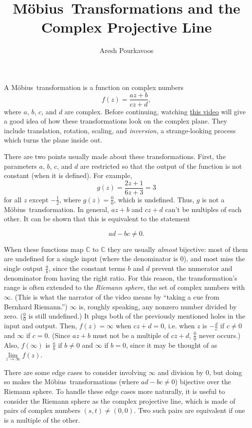 \documentclass{article}
\begin{document}
\newcommand{\mobius}{M{\"o}bius\ }

\title{\mobius Transformations and the Complex Projective Line}
\author{Aresh Pourkavoos}
\maketitle

A \mobius transformation is a function on complex numbers
\[f(z)=\frac{az+b}{cz+d},\]
where $a$, $b$, $c$, and $d$ are complex.
Before continuing, watching
\href{http://www-users.math.umn.edu/~arnold//moebius/}{this video}
will give a good idea of how these transformations look on the complex plane.
They include translation, rotation, scaling, and \textit{inversion},
a strange-looking process which turns the plane inside out.

There are two points usually made about these transformations.
First, the parameters $a$, $b$, $c$, and $d$ are restricted
so that the output of the function is not constant
(when it is defined).
For example,
\[g(z)=\frac{2z+1}{6z+3}=3\]
for all $z$ except $-\frac{1}{2}$, where $g(z)=\frac{0}{0}$, which is undefined.
Thus, $g$ is not a \mobius transformation.
In general, $az+b$ and $cz+d$ can't be multiples of each other.
It can be shown that this is equivalent to the statement

\[ad-bc \neq 0.\]

When these functions map $\mathbb{C}$ to $\mathbb{C}$
they are usually \textit{almost} bijective:
most of them are undefined for a single input
(where the denominator is 0),
and most miss the single output $\frac{a}{b}$,
since the constant terms $b$ and $d$ prevent the numerator and denominator
from having the right ratio.
For this reason, the transformation's range is often extended
to the \textit{Riemann sphere}, the set of complex numbers with $\infty$.
(This is what the narrator of the video means by
``taking a cue from Bernhard Riemann.'')
$\infty$ is, roughly speaking, any nonzero number divided by zero.
($\frac{0}{0}$ is still undefined.)
It plugs both of the previously mentioned holes in the input and output.
Then, $f(z)=\infty$ when $cz+d=0$,
i.e. when $z$ is $-\frac{d}{c}$ if $c \neq 0$ and $\infty$ if $c=0$.
(Since $az+b$ must not be a multiple of $cz+d$,
$\frac{0}{0}$ never occurs.)
Also, $f(\infty)$ is $\frac{a}{b}$ if $b \neq 0$ and $\infty$ if $b=0$,
since it may be thought of as $\lim\limits_{z\rightarrow\infty}f(z)$.

There are some edge cases to consider involving $\infty$ and division by 0,
but doing so makes the \mobius transformations (where $ad-bc \neq 0$)
bijective over the Riemann sphere.
To handle these edge cases more naturally,
it is useful to consider the Riemann sphere as the complex projective line,
which is made of pairs of complex numbers $(s, t) \neq (0, 0)$.
Two such pairs are equivalent if one is a multiple of the other.
\end{document}
